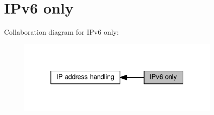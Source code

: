 \hypertarget{group__ip6addr}{}\section{I\+Pv6 only}
\label{group__ip6addr}
Collaboration diagram for I\+Pv6 only\+:
\nopagebreak
\begin{figure}[H]
\begin{center}
\leavevmode
\includegraphics[width=277pt]{group__ip6addr}
\end{center}
\end{figure}
